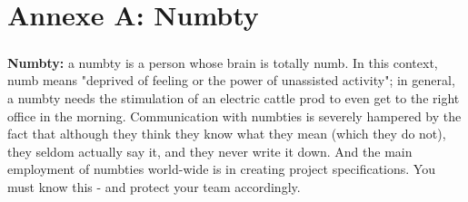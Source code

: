 \chapter{Annexe A: Numbty}
\paragraph*{}
\textbf{Numbty:} a numbty is a person whose brain is totally numb. In this context, numb means "deprived of feeling or the power of unassisted activity"; in general, a numbty needs the stimulation of an electric cattle prod to even get to the right office in the morning. Communication with numbties is severely hampered by the fact that although they think they know what they mean (which they do not), they seldom actually say it, and they never write it down. And the main employment of numbties world-wide is in creating project specifications. You must know this - and protect your team accordingly.